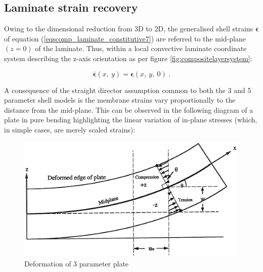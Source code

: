\subsection{Laminate strain recovery}

Owing to the dimensional reduction from 3D to 2D, the generalised shell strains $\bar{\boldsymbol{\epsilon}}$ of equation (\ref{eqscomp_laminate_constitutive7}) are referred to the mid-plane $(z=0)$ of the laminate. Thus, within a local convective laminate coordinate system describing the z-axis orientation as per figure \ref{fig:compositelayersystem}:

\begin{equation} 
\bar{\boldsymbol{\epsilon}} (x,\ y) = \boldsymbol{\epsilon} (x,\ y,\ 0)
\label{eqscomp_strain_recovery1}\ .
\end{equation}

A consequence of the straight director assumption common to both the 3 and 5 parameter shell models is the membrane strains vary proportionally to the distance from the mid-plane. This can be observed in the following diagram of a plate in pure bending highlighting the linear variation of in-plane stresses (which, in simple cases, are merely scaled strains):

\begin{figure}[H]
	\centering
	\def\svgwidth{\columnwidth}
	\includegraphics[width=12cm]{images/composite_nasa_strains.png}
	\caption{Deformation of 3 parameter plate \cite{nasanettles1994}}
	\label{fig:compositenasastrains}
\end{figure}

